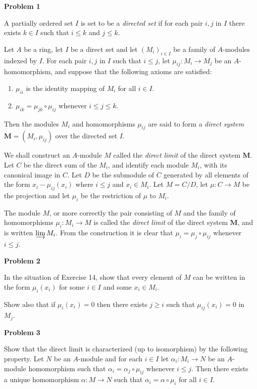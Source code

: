 \documentclass{article}
\begin{document}
\textbf{Problem 1}


A partially ordered set $I$ is set to be a \textit{directed set} if for each pair $i, j$ in $I$ there exists $k\in I$ such that $i\leq k$ and $j\leq k$.

Let $A$ be a ring, let $I$ be a direct set and let $(M_i)_{i\in I}$ be a family of $A$-modules indexed by $I$. For each pair $i, j$ in $I$ such that $i\leq j$, let $\mu_{ij}:M_i\to M_j$ be an $A$-homomorphism, and suppose that the following axioms are satisfied:

\begin{enumerate}
    \item $\mu_{ii}$ is the identity mapping of $M_i$ for all $i\in I$.
    \item $\mu_{ik}=\mu_{jk}\circ\mu_{ij}$ whenever $i\leq j\leq k$.
\end{enumerate}

Then the modules $M_i$ and homomorphisms $\mu_{ij}$ are said to form a \textit{direct system} $\mathbf{M}=(M_i,\mu_{ij})$ over the directed set $I$.

We shall construct an $A$-module $M$ called the \textit{direct limit} of the direct system $\mathbf{M}$. Let $C$ be the direct sum of the $M_i$, and identify each module $M_i$, with its canonical image in $C$. Let $D$ be the submodule of $C$ generated by all elements of the form $x_i-\mu_{ij}(x_i)$ where $i\leq j$ and $x_i\in M_i$. Let $M = C/D$, let $\mu:C\to M$ be the projection and let $\mu_i$ be the restriction of $\mu$ to $M_i$.

The module $M$, or more correctly the pair consisting of $M$ and the family of homomorphisms $\mu_i:M_i\to M$ is called the \textit{direct limit} of the direct system $\mathbf{M}$, and is written $\varinjlim M_i$. From the construction it is clear that $\mu_i=\mu_j\circ\mu_{ij}$ whenever $i\leq j$.


\textbf{Problem 2}

In the situation of Exercise 14, show that every element of $M$ can be written in the form $\mu_i(x_i)$ for some $i\in I$ and some $x_i\in M_i$.

Show also that if $\mu_i(x_i)=0$ then there exists $j\geq i$ such that $\mu_{ij}(x_i)=0$ in $M_j$. 

\textbf{Problem 3}


Show that the direct limit is characterized (up to isomorphism) by the following property. Let $N$ be an $A$-module and for each $i\in I$ let $\alpha_i :M_i\to N$ be an $A$-module homomorphism such that $\alpha_i = \alpha_j\circ\mu_{ij}$ whenever $i \leq j$. Then there exists a unique homomorphism $\alpha: M\to N$ such that $\alpha_i=\alpha\circ\mu_i$ for all $i\in I$. 
\end{document}

